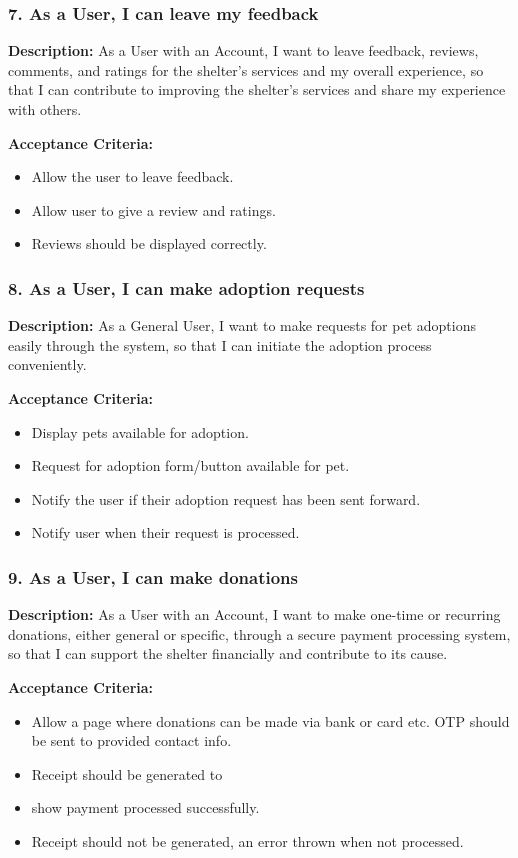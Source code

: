 \subsubsection*{7. As a User, I can leave my feedback} 
    
    \textbf{Description:} As a User with an Account, I want to leave feedback, reviews, comments, and ratings for the shelter's services and my overall experience, so that I can contribute to improving the shelter's services and share my experience with others. 
    
    \textbf{Acceptance Criteria:}
    \begin{itemize}
       \item Allow the user to leave feedback.
       \item Allow user to give a review and ratings.
       \item Reviews should be displayed correctly.
    \end{itemize}

\subsubsection*{8. As a User, I can make adoption requests} 
    
    \textbf{Description:} As a General User, I want to make requests for pet adoptions easily through the system, so that I can initiate the adoption process conveniently.
    
    \textbf{Acceptance Criteria:}
    \begin{itemize}
      \item Display pets available for adoption.
      \item Request for adoption form/button available for pet.
      \item Notify the user if their adoption request has been sent forward.
      \item Notify user when their request is processed.
    \end{itemize}

\subsubsection*{9. As a User, I can make donations}     
    \textbf{Description:} As a User with an Account, I want to make one-time or recurring donations, either general or specific, through a secure payment processing system, so that I can support the shelter financially and contribute to its cause.
    
    \textbf{Acceptance Criteria:}
    \begin{itemize}
        \item Allow a page where donations can be made via bank or card etc. OTP should be sent to provided contact info.
        \item Receipt should be generated to \item show payment processed successfully.
        \item Receipt should not be generated, an error thrown when not processed.
    \end{itemize}
